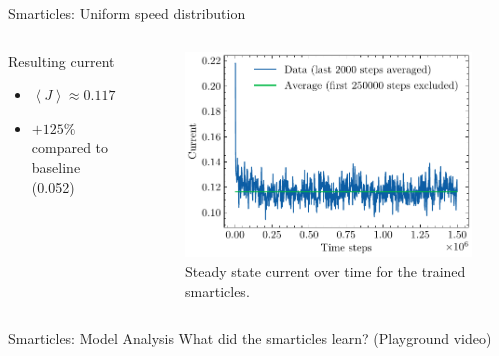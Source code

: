 \documentclass[10pt,xcolor=table, aspectratio=1610]{beamer}
\begin{document}
\begin{frame}{Smarticles: Uniform speed distribution}
  \begin{columns}
    \begin{block}{Resulting current}
      \begin{itemize}
        \item $\left\langle J \right\rangle \approx 0.117$
        \item $+125\%$ compared to baseline (0.052)
      \end{itemize}
    \end{block}
    \begin{figure}
        \includegraphics[width=\textwidth]{../Thesis/img/results/uniform_speeds.pdf}
        \caption*{Steady state current over time for the trained smarticles.}
      \end{figure}
  \end{columns}
\end{frame}

\begin{frame}{Smarticles: Model Analysis}
  What did the smarticles learn? (Playground video)
\end{frame}
\end{document}
